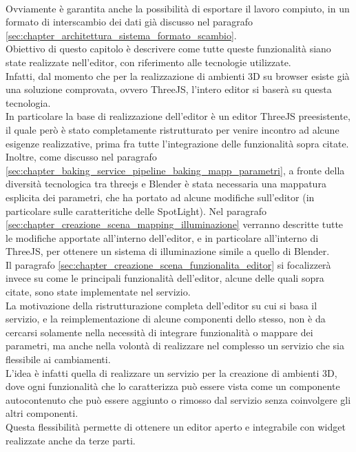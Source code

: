 \\ 
Ovviamente è garantita anche la possibilità di esportare il lavoro compiuto, in un formato di interscambio dei dati già discusso nel paragrafo \ref{sec:chapter_architettura_sistema_formato_scambio}.
\\
Obiettivo di questo capitolo è descrivere come tutte queste funzionalità siano state realizzate nell’editor, con riferimento alle tecnologie utilizzate.
\\ 
Infatti, dal momento che per la realizzazione di ambienti 3D su browser esiste già una soluzione comprovata, ovvero ThreeJS, l’intero editor si baserà su questa tecnologia.
\\
In particolare la base di realizzazione dell’editor è un editor ThreeJS preesistente, il quale però è stato completamente ristrutturato per venire incontro ad alcune esigenze realizzative, prima fra tutte l’integrazione delle funzionalità sopra citate.
\\  
Inoltre, come discusso nel paragrafo \ref{sec:chapter_baking_service_pipeline_baking_mapp_parametri}, a fronte della diversità tecnologica tra threejs e Blender è stata necessaria una mappatura esplicita dei parametri, che ha portato ad alcune modifiche sull’editor (in particolare sulle caratteritiche delle SpotLight). Nel paragrafo \ref{sec:chapter_creazione_scena_mapping_illuminazione} verranno descritte tutte le modifiche apportate all’interno dell’editor, e in particolare all’interno di ThreeJS, per ottenere un sistema di illuminazione simile a quello di Blender.
\\  
Il paragrafo \ref{sec:chapter_creazione_scena_funzionalita_editor} si focalizzerà invece su come le principali funzionalità dell’editor, alcune delle quali sopra citate, sono state implementate nel servizio.
\\
La motivazione della ristrutturazione completa dell’editor su cui si basa il servizio, e la reimplementazione di alcune componenti dello stesso, non è da cercarsi solamente nella necessità di integrare funzionalità o mappare dei parametri, ma anche nella volontà di realizzare nel complesso un servizio che sia flessibile ai cambiamenti.
\\ 
L’idea è infatti quella di realizzare un servizio per la creazione di ambienti 3D, dove ogni funzionalità che lo caratterizza può essere vista come un componente autocontenuto che può essere aggiunto o rimosso dal servizio senza coinvolgere gli altri componenti.
\\
Questa flessibilità permette di ottenere un editor aperto e integrabile con widget realizzate anche da terze parti.
